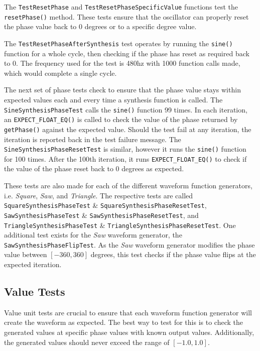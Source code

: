 \documentclass[a4paper,12pt]{report}
\begin{document}
The \texttt{Test\-Reset\-Phase} and \texttt{Test\-Reset\-Phase\-Specific\-Value} functions test the \texttt{reset\-Phase()} method. These tests ensure that the oscillator can properly reset the phase value back to 0 degrees or to a specific degree value.

The \texttt{Test\-Reset\-Phase\-After\-Synthesis} test operates by running the \texttt{sine()} function for a whole cycle, then checking if the phase has reset as required back to 0. The frequency used for the test is 480hz with 1000 function calls made, which would complete a single cycle.

The next set of phase tests check to ensure that the phase value stays within expected values each and every time a synthesis function is called. The \texttt{Sine\-Synthesis\-Phase\-Test} calls the \texttt{sine()} function 99 times. In each iteration, an \texttt{EXPECT\_FLOAT\_EQ()} is called to check the value of the phase returned by \texttt{getPhase()} against the expected value. Should the test fail at any iteration, the iteration is reported back in the test failure message. The \texttt{Sine\-Synthesis\-Phase\-Reset\-Test} is similar, however it runs the \texttt{sine()} function for 100 times. After the 100th iteration, it runs \texttt{EXPECT\-\_FLOAT\-\_EQ()} to check if the value of the phase reset back to 0 degrees as expected.

These tests are also made for each of the different waveform function generators, i.e. \emph{Square}, \emph{Saw}, and \emph{Triangle}. The respective tests are called \texttt{Square\-Synthesis\-Phase\-Test} \& \texttt{Square\-Synthesis\-Phase\-Reset\-Test}, \texttt{Saw\-Synthesis\-Phase\-Test} \& \texttt{Saw\-Synthesis\-Phase\-Reset\-Test}, and \texttt{Triangle\-Synthesis\-Phase\-Test} \& \texttt{Triangle\-Synthesis\-Phase\-Reset\-Test}. One additional test exists for the \emph{Saw} waveform generator, the \texttt{Saw\-Synthesis\-Phase\-Flip\-Test}. As the \emph{Saw} waveform generator modifies the phase value between $[-360,360]$ degrees, this test checks if the phase value flips at the expected iteration.

\subsection{Value Tests}
\label{subsec:valuetests}
Value unit tests are crucial to ensure that each waveform function generator will create the waveform as expected. The best way to test for this is to check the generated values at specific phase values with known output values. Additionally, the generated values should never exceed the range of $[-1.0,1.0]$.
\end{document}
